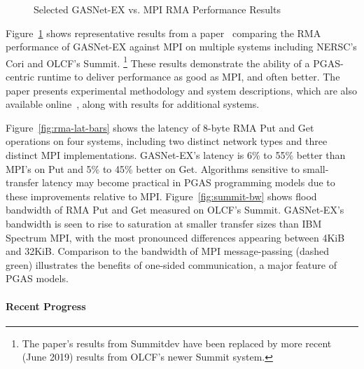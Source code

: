 \begin{figure}[htb]
  \centering
  \caption{\label{fig:gasnet-ex-rma} Selected GASNet-EX vs. MPI RMA Performance Results}
\end{figure}

Figure~\ref{fig:gasnet-ex-rma} shows representative results from a
paper~\cite{gasnet-lcpc18} comparing
the RMA performance of GASNet-EX against MPI on multiple systems including
NERSC's Cori and OLCF's Summit.%
\footnote{The paper's results from Summitdev
have been replaced by more recent (June 2019) results from OLCF's newer Summit system.}
These results demonstrate the ability of a PGAS-centric runtime to
deliver performance as good as MPI, and often better.
%
The paper presents experimental methodology and system descriptions, which are
also available online~\cite{gasnet-site}, along with results for additional
systems.

Figure~\ref{fig:rma-lat-bars} shows the latency of 8-byte RMA Put and Get operations on
four systems, including two distinct network types and three distinct MPI
implementations.
%
GASNet-EX's latency is 6\% to 55\% better than MPI's on Put and 5\% to 45\%
better on Get.
%
Algorithms sensitive to small-transfer latency may become practical in PGAS
programming models due to these improvements relative to MPI.
%
Figure~\ref{fig:summit-bw} shows flood bandwidth of RMA Put and Get measured
on OLCF's Summit.
GASNet-EX's bandwidth is seen to rise to saturation at smaller
transfer sizes than IBM Spectrum MPI, with the most pronounced differences
appearing between 4KiB and 32KiB.
%
Comparison to the bandwidth of MPI message-passing (dashed green) illustrates the
benefits of one-sided communication, a major feature of PGAS models.


\paragraph{Recent Progress}

